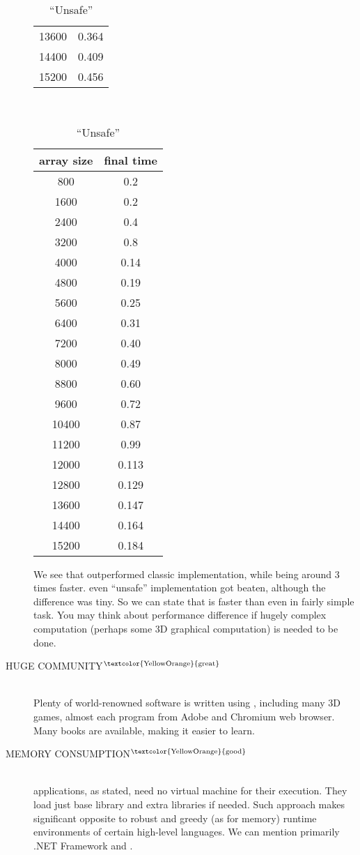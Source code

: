 \begin{description}
\begin{table}[ht]
\begin{subtable}[t]{0.3\textwidth}
\begin{tabular}{c | c}
13600 & 0.364 \\
14400 & 0.409 \\
15200 & 0.456
\end{tabular}
\end{subtable}
~
\begin{subtable}[t]{0.3\textwidth}
\centering
\caption{\enquote{Unsafe} \csharp}
\begin{tabular}{c | c}
array size & final time \\
\hline
800 & 0.2 \\
1600 & 0.2 \\
2400 & 0.4 \\
3200 & 0.8 \\
4000 & 0.14 \\
4800 & 0.19 \\
5600 & 0.25 \\
6400 & 0.31 \\
7200 & 0.40 \\
8000 & 0.49 \\
8800 & 0.60 \\
9600 & 0.72 \\
10400 & 0.87 \\
11200 & 0.99 \\
12000 & 0.113 \\
12800 & 0.129 \\
13600 & 0.147 \\
14400 & 0.164 \\
15200 & 0.184
\end{tabular}
\end{subtable}
\end{table}

We see that \cpp outperformed classic \csharp implementation, while being a\-round 3 times faster. even \enquote{unsafe} \csharp implementation got beaten, although the difference was tiny. So we can state that \cpp is faster than \csharp even in fairly simple task. You may think about performance difference if hugely complex computation (perhaps some 3D graphical computation) is needed to be done.

\item[HUGE COMMUNITY$^{\text{\textcolor{YellowOrange}{great}}}$]\hfill \\
Plenty of world-renowned software is written using \cpp, including many 3D games, almost each program from Adobe and Chromium web browser. Many \cpp books are available, making it easier to learn.

\item[MEMORY CONSUMPTION$^{\text{\textcolor{YellowOrange}{good}}}$]\hfill \\
\cpp applications, as stated, need no virtual machine for their execution. They load just base \cpp library and extra libraries if needed. Such approach makes significant opposite to robust and greedy (as for memory) runtime environments of certain high-level languages. We can mention primarily .NET Framework and .


\end{description}
